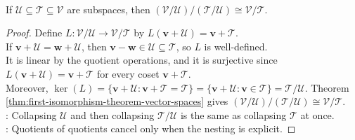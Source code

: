 \begin{theorem} \label{thm:third-isomorphism-vector-spaces} \\
If $\mathcal{U}\subseteq\mathcal{T}\subseteq\mathcal{V}$ are subspaces, then $(\mathcal{V}/\mathcal{U})/(\mathcal{T}/\mathcal{U})\cong \mathcal{V}/\mathcal{T}$.
\begin{proof}
Define $L:\mathcal{V}/\mathcal{U}\to\mathcal{V}/\mathcal{T}$ by $L(\mathbf{v}+\mathcal{U})=\mathbf{v}+\mathcal{T}$.\\
If $\mathbf{v}+\mathcal{U}=\mathbf{w}+\mathcal{U}$, then $\mathbf{v}-\mathbf{w}\in\mathcal{U}\subseteq\mathcal{T}$, so $L$ is well-defined.\\
It is linear by the quotient operations, and it is surjective since $L(\mathbf{v}+\mathcal{U})=\mathbf{v}+\mathcal{T}$ for every coset $\mathbf{v}+\mathcal{T}$.\\
Moreover, $\ker(L)=\{\mathbf{v}+\mathcal{U}: \mathbf{v}+\mathcal{T}=\mathcal{T}\} =\{\mathbf{v}+\mathcal{U}: \mathbf{v}\in\mathcal{T}\} =\mathcal{T}/\mathcal{U}$. Theorem \ref{thm:first-isomorphism-theorem-vector-spaces} gives $(\mathcal{V}/\mathcal{U})/(\mathcal{T}/\mathcal{U})\cong\mathcal{V}/\mathcal{T}$.\\
: Collapsing $\mathcal{U}$ and then collapsing $\mathcal{T}/\mathcal{U}$ is the same as collapsing $\mathcal{T}$ at once.\\
: Quotients of quotients cancel only when the nesting is explicit.
\end{proof}
\end{theorem}
